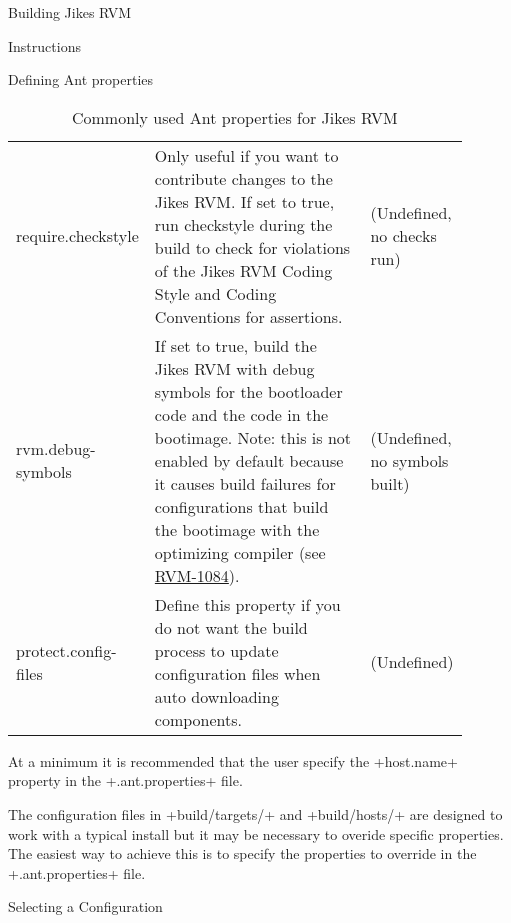 \begin{section}{Building Jikes RVM}
\begin{subsection}{Instructions}
\begin{subsubsection}{Defining Ant properties}
\begin{table}
\begin{tabular}{p{0.15\linewidth}p{0.6\linewidth}p{0.15\linewidth}}
require.\newline checkstyle & Only useful if you want to contribute changes to the Jikes RVM. If set to true, run checkstyle during the build to check for violations of the Jikes RVM Coding Style and Coding Conventions for assertions. & (Undefined, no checks run) \\
rvm.debug-symbols & If set to true, build the Jikes RVM with debug symbols for the bootloader code and the code in the bootimage. Note: this is not enabled by default because it causes build failures for configurations that build the bootimage with the optimizing compiler (see \href{https://xtenlang.atlassian.net/browse/RVM-1084}{RVM-1084}). & (Undefined, no symbols built) \\
protect.config-files & Define this property if you do not want the build process to update configuration files when auto downloading components. & (Undefined) \\
\end{tabular}
\caption{Commonly used Ant properties for Jikes RVM}
\end{table}

At a minimum it is recommended that the user specify the \spverb+host.name+ property in the \spverb+.ant.properties+ file.

The configuration files in \spverb+build/targets/+ and \spverb+build/hosts/+ are designed to work with a typical install but it may be necessary to overide specific properties. The easiest way to achieve this is to specify the properties to override in the \spverb+.ant.properties+ file.

\end{subsubsection}

\begin{subsubsection}{Selecting a Configuration}


\end{subsubsection}
\end{subsection}
\end{section}
